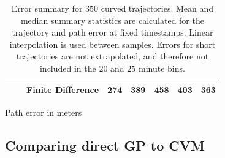 \begin{table}
\begin{subtable}{\textwidth}
{\begin{tabular}{lllrrrrr}
                        &                & Finite Difference & 274 & 389  & 458  & 403  & 363  \\
                \bottomrule
            \end{tabular}
        }
        \caption{Path error in meters}
        \label{table:stats_curved_path_err}
    \end{subtable}
    \caption{Error summary for $350$ curved trajectories. Mean and median summary statistics are calculated for the trajectory and path error at fixed timestamps. Linear interpolation is used between samples. Errors for short trajectories are not extrapolated, and therefore not included in the $20$ and $25$ minute bins.}
    \label{table:stats_curved_error}
\end{table}


\subsection{Comparing direct GP to CVM}
